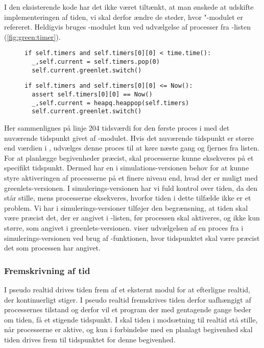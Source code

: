 I den eksisterende kode har det ikke været tiltænkt, at man ønskede at udskifte implementeringen af tiden, vi skal derfor ændre de steder, hvor "-modulet er refereret. Heldigvis bruges -modulet kun ved udvælgelse af processer fra -listen (\cref{fig:green:timer}). 
\begin{figure}[hbtp]
\begin{minipage}[c]{\linewidth}
\begin{lstlisting}[firstnumber=204, label=fig:green:timer, caption=Udvælgelse af proces fra listen timers (fra scheduling.py)]
if self.timers and self.timers[0][0] < time.time():
  _,self.current = self.timers.pop(0)
  self.current.greenlet.switch()
\end{lstlisting}
\end{minipage}
\begin{minipage}[c]{\linewidth}
\begin{lstlisting}[firstnumber=124, label=fig:sim:timer, caption=Udvælgelse af proces fra listen timers (fra simulation.py)]
if self.timers and self.timers[0][0] <= Now():
  assert self.timers[0][0] == Now()
  _,self.current = heapq.heappop(self.timers)
  self.current.greenlet.switch()
\end{lstlisting}
\end{minipage}
\end{figure}
Her sammenlignes på linje 204 tidsværdi for den første proces i  med det nuværende tidspunkt givet af -modulet.
Hvis det nuværende tidspunkt er større end værdien i , udvælges denne proces til at køre næste gang og fjernes fra listen.
For at planlægge begivenheder præcist, skal processerne kunne eksekveres på et specifikt tidspunkt. Dermed har  \sched en i simulations-versionen behov for at kunne  styre aktiveringen af processerne på et finere niveau end, hvad der er muligt med greenlets-versionen.  
I simulerings-versionen har vi fuld kontrol over tiden, da  den står stille, mens processerne eksekveres, hvorfor tiden i dette tilfælde ikke er et problem.
Vi har i simulerings-versioner tilføjer den begrænsning, at tiden skal være præcist det, der er angivet i -listen, før processen skal aktiveres, og ikke kun større, som angivet i greenlets-versionen.  viser udvælgelsen af en proces fra  i simulerings-versionen ved brug af -funktionen, hvor tidspunktet skal være præcist det som processen har angivet.

\subsubsection{Fremskrivning af tid}
I pseudo realtid drives tiden frem af et eksternt modul for at efterligne realtid, der kontinuerligt stiger. I pseudo realtid fremskrives tiden derfor uafhængigt af processernes tilstand og derfor vil et program der med gentagende gange beder om tiden, få et stigende tidspunkt. I \des  skal tiden i modsætning til realtid stå stille, når processerne er aktive, og kun i forbindelse med en planlagt begivenhed skal tiden drives frem til tidspunktet for denne begivenhed.

